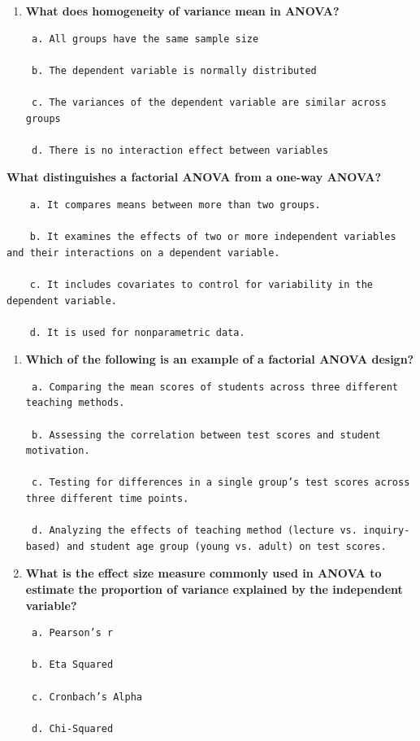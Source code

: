 \documentclass[
  letterpaper,
  DIV=11,
  numbers=noendperiod]{scrreprt}
\begin{document}
\begin{enumerate}
\begin{verbatim}
 a. Ordinal data or non-normal distributions 

 b. Normally distributed interval data 

 c. Binary data 

 d. Continuous data 
\end{verbatim}
\item
  \textbf{What does homogeneity of variance mean in ANOVA?}

\begin{verbatim}
 a. All groups have the same sample size 

 b. The dependent variable is normally distributed 

 c. The variances of the dependent variable are similar across groups 

 d. There is no interaction effect between variables 
\end{verbatim}
\end{enumerate}

\textbf{What distinguishes a factorial ANOVA from a one-way ANOVA?}

\begin{verbatim}
    a. It compares means between more than two groups. 

    b. It examines the effects of two or more independent variables and their interactions on a dependent variable. 

    c. It includes covariates to control for variability in the dependent variable. 

    d. It is used for nonparametric data. 
\end{verbatim}

\begin{enumerate}
\def\labelenumi{\arabic{enumi}.}
\setcounter{enumi}{6}
\item
  \textbf{Which of the following is an example of a factorial ANOVA
  design?}

\begin{verbatim}
 a. Comparing the mean scores of students across three different teaching methods. 

 b. Assessing the correlation between test scores and student motivation. 

 c. Testing for differences in a single group’s test scores across three different time points. 

 d. Analyzing the effects of teaching method (lecture vs. inquiry-based) and student age group (young vs. adult) on test scores. 
\end{verbatim}
\item
  \textbf{What is the effect size measure commonly used in ANOVA to
  estimate the proportion of variance explained by the independent
  variable?}

\begin{verbatim}
 a. Pearson’s r 

 b. Eta Squared  

 c. Cronbach’s Alpha 

 d. Chi-Squared 
\end{verbatim}
\end{enumerate}
\end{document}
